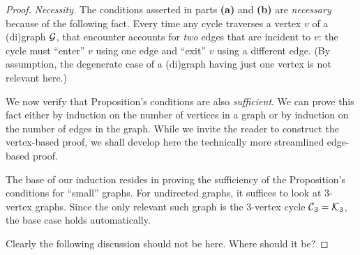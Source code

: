\begin{proof}
{\em Necessity.}
The conditions asserted in parts {\bf (a)} and {\bf (b)} are {\em necessary} because of
the following fact.  Every time any cycle traverses a vertex $v$ of a (di)graph $\mbox{$\cal G$}$, that 
encounter accounts for {\em two} edges that are incident to $v$: the cycle must ``enter'' $v$
using one edge and ``exit'' $v$ using a different edge.  (By assumption, the degenerate case 
of a (di)graph having just one vertex is not relevant here.)


\smallskip

We now verify that Proposition's conditions are also {\em sufficient}.  We can prove this
fact either by induction on the number of vertices in a graph or by induction on the number
of edges in the graph.  While we invite the reader to construct the vertex-based proof, we
shall develop here the technically more streamlined edge-based proof. 

The base of our induction resides in proving the sufficiency of the Proposition's conditions
for ``small'' graphs.  For undirected graphs, it suffices to look at $3$-vertex graphs.  Since the
only relevant such graph is the $3$-vertex cycle $\mbox{$\cal C$}_3 = \mbox{$\cal K$}_3$, the base case holds 
automatically.

\bigskip

{\Arny Clearly the following discussion should not be here.  Where should it be?}

\noindent {}
\end{proof}
